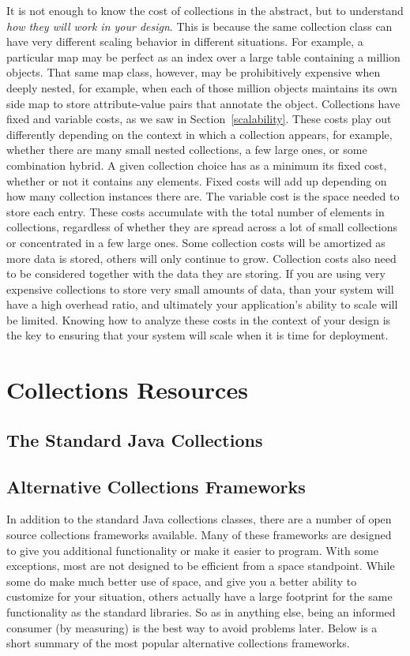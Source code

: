 It is not enough to know the cost
of collections in the abstract, but to understand \emph{how they will work in
your design}. This is because the same collection class can have very different
scaling behavior in different situations. For example, a particular map
may be perfect as an index over a large table containing a
million objects. That same map class, however, may be prohibitively expensive
when deeply nested, for example, when each of those
million objects maintains its own side map to store attribute-value pairs that
annotate the object.
Collections have fixed and variable costs, as we saw
in Section~\ref{scalability}. These costs play out differently
depending on the context in which a collection appears, for example, whether
there are many small nested collections, a few large ones, or some combination
hybrid.  A given collection choice has as a minimum its fixed cost,
whether or not it contains any elements. Fixed costs will add up depending on
how many collection instances there are. The variable cost is the space needed to store each entry. These
 costs accumulate with the total number of
elements in collections, regardless of whether they are spread across a lot of
small collections or concentrated in a few large ones. 
Some collection costs will be amortized as more data is stored, others will only
continue to grow. Collection costs also need to be considered together with the data they are
storing. If you are using very expensive collections to store very small amounts
of data, than your system will have a high overhead ratio, and ultimately your application's ability
to scale will be limited. 
Knowing how to analyze these costs in the context of your design
is the key to ensuring that your system will scale when it is time for
deployment.  

\section{Collections Resources}
\subsection{The Standard Java Collections}
\subsection{Alternative Collections Frameworks}
In addition to the standard Java collections classes, there are a number of
open source collections frameworks available. Many of these frameworks
are designed to give you additional functionality or make it easier to
program. With some exceptions, most are not designed to be efficient from a
space standpoint. While some do make much better use of space, and give you a
better ability to customize for your situation, others actually have a
large footprint for the same functionality as the standard libraries. So as in
anything else, being an informed consumer (by measuring) is the best way to
avoid problems later. Below is a short summary of the most
popular alternative collections frameworks.

